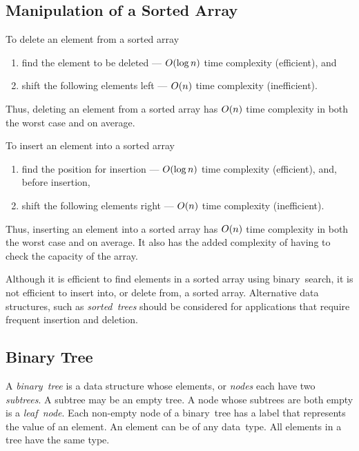
\subsection{Manipulation of a Sorted Array}
\usetikzlibrary{arrows.meta, positioning, shapes.multipart}

To delete an element from a sorted array
\begin{enumerate}
  \item find the element to be deleted --- \( O\!\left(\log n\right) \) time complexity (efficient), and
  \item shift the following elements left --- \( O\!\left(n\right) \) time complexity (inefficient).
\end{enumerate}
Thus, deleting an element from a sorted array has \( O\!\left(n\right) \) time complexity in both the worst case and on average.

To insert an element into a sorted array
\begin{enumerate}
  \item find the position for insertion --- \( O\!\left(\log n\right) \) time complexity (efficient), and, before insertion,
  \item shift the following elements right --- \( O\!\left(n\right) \) time complexity (inefficient).
\end{enumerate}
Thus, inserting an element into a sorted array has \( O\!\left(n\right) \) time complexity in both the worst case and on average.
It also has the added complexity of having to check the capacity of the array.

Although it is efficient to find elements in a sorted array using binary~search, it is not efficient to insert into, or delete from, a sorted array.
Alternative data structures, such as \emph{sorted~trees} should be considered for applications that require frequent insertion and deletion.

\subsection{Binary Tree}

A \emph{binary~tree} is a data structure whose elements, or \emph{nodes} each have two \emph{subtrees}.
A subtree may be an empty tree.
A node whose subtrees are both empty is a \emph{leaf~node}.
Each non-empty node of a binary~tree has a label that represents the value of an element.
An element can be of any data~type.
All elements in a tree have the same type.

